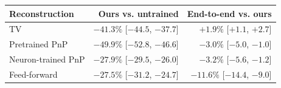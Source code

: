 \begin{tabular}{lrr}
\toprule
Reconstruction & Ours vs. untrained & End-to-end vs. ours \\
\midrule
TV & $-41.3\%$ [$-44.5$, $-37.7$] & $+1.9\%$ [$+1.1$, $+2.7$] \\
Pretrained PnP & $-49.9\%$ [$-52.8$, $-46.6$] & $-3.0\%$ [$-5.0$, $-1.0$] \\
Neuron-trained PnP & $-27.9\%$ [$-29.5$, $-26.0$] & $-3.2\%$ [$-5.6$, $-1.2$] \\
Feed-forward & $-27.5\%$ [$-31.2$, $-24.7$] & $-11.6\%$ [$-14.4$, $-9.0$] \\
\bottomrule
\end{tabular}
